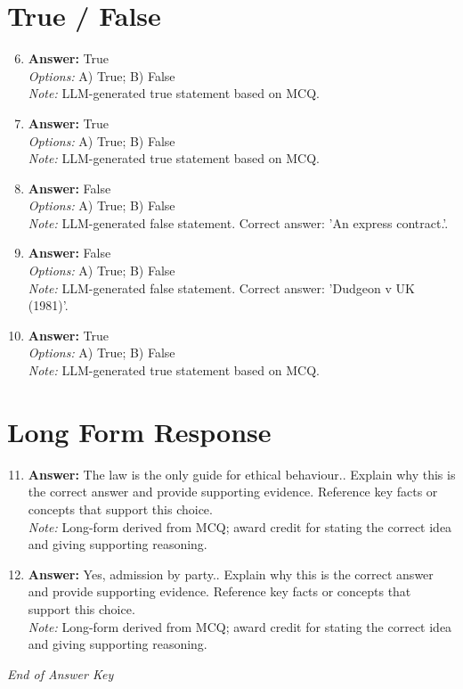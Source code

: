 \documentclass[12pt]{article}
\begin{document}
\section*{True / False}
\begin{enumerate}[label=\arabic*.]
\setcounter{enumi}{5}
\item \textbf{Answer:} True
\\ \textit{Options:} A) True; B) False
\\ \textit{Note:} LLM-generated true statement based on MCQ.
\item \textbf{Answer:} True
\\ \textit{Options:} A) True; B) False
\\ \textit{Note:} LLM-generated true statement based on MCQ.
\item \textbf{Answer:} False
\\ \textit{Options:} A) True; B) False
\\ \textit{Note:} LLM-generated false statement. Correct answer: 'An express contract.'.
\item \textbf{Answer:} False
\\ \textit{Options:} A) True; B) False
\\ \textit{Note:} LLM-generated false statement. Correct answer: 'Dudgeon v UK (1981)'.
\item \textbf{Answer:} True
\\ \textit{Options:} A) True; B) False
\\ \textit{Note:} LLM-generated true statement based on MCQ.
\end{enumerate}

\section*{Long Form Response}
\begin{enumerate}[label=\arabic*.]
\setcounter{enumi}{10}
\item \textbf{Answer:} The law is the only guide for ethical behaviour.. Explain why this is the correct answer and provide supporting evidence. Reference key facts or concepts that support this choice.
\\ \textit{Note:} Long-form derived from MCQ; award credit for stating the correct idea and giving supporting reasoning.
\item \textbf{Answer:} Yes, admission by party.. Explain why this is the correct answer and provide supporting evidence. Reference key facts or concepts that support this choice.
\\ \textit{Note:} Long-form derived from MCQ; award credit for stating the correct idea and giving supporting reasoning.
\end{enumerate}

\vfill
\noindent\textit{End of Answer Key}
\end{document}
